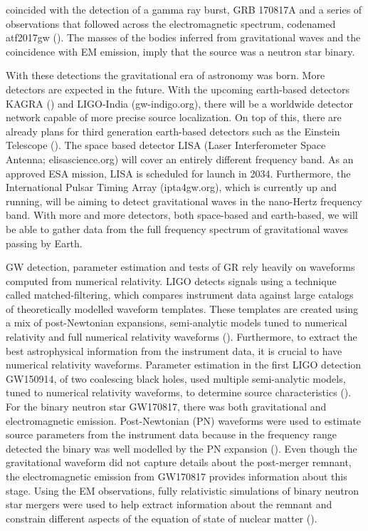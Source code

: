 coincided with the detection of a gamma ray burst, GRB 170817A and a series of observations that followed across the electromagnetic spectrum, codenamed atf2017gw (\citet*{villar:2017wcc}). The masses of the bodies inferred from gravitational waves and the coincidence with EM emission, imply that the source was a neutron star binary.

With these detections the gravitational era of astronomy was born. More detectors are expected in the future. With the upcoming earth-based detectors KAGRA (\citet*{somiya2012detector}) and LIGO-India (gw-indigo.org), there will be a worldwide detector network capable of more precise source localization. On top of this, there are already plans for third generation earth-based detectors such as the Einstein Telescope (\cite{einsteintelescope}). The space based detector LISA (Laser Interferometer Space Antenna; elisascience.org) will cover an entirely different frequency band. As an approved ESA mission, LISA is scheduled for launch in 2034. Furthermore, the International Pulsar Timing Array (ipta4gw.org), which is currently up and running, will be aiming to detect gravitational waves in the nano-Hertz frequency band.  With more and more detectors, both space-based and earth-based, we will be able to gather data from the full frequency spectrum of gravitational waves passing by Earth.

GW detection, parameter estimation and tests of GR rely heavily on waveforms computed from numerical relativity. LIGO detects signals using a technique called matched-filtering, which compares instrument data against large catalogs of theoretically modelled waveform templates. These templates are created using a mix of post-Newtonian expansions, semi-analytic models tuned to numerical relativity and full numerical relativity waveforms (\citet*{sachdev2019gstlal}). Furthermore, to extract the best astrophysical information from the instrument data, it is crucial to have numerical relativity waveforms. Parameter estimation in the first LIGO detection GW150914, of two coalescing black holes, used multiple semi-analytic models, tuned to numerical relativity waveforms, to determine source characteristics (\cite{abbott2016improved}). For the binary neutron star GW170817, there was both gravitational and electromagnetic emission. Post-Newtonian (PN) waveforms were used to estimate source parameters from the instrument data because in the frequency range detected the binary was well modelled by the PN expansion (\cite{abbott2017gw170817}). Even though the gravitational waveform did not capture details about the post-merger remnant, the electromagnetic emission from GW170817 provides information about this stage. Using the EM observations, fully relativistic simulations of binary neutron star mergers were used to help extract information about the remnant and constrain different aspects of the equation of state of nuclear matter (\citet*{radice2017gw170817,shibata2017gw170817}). 

